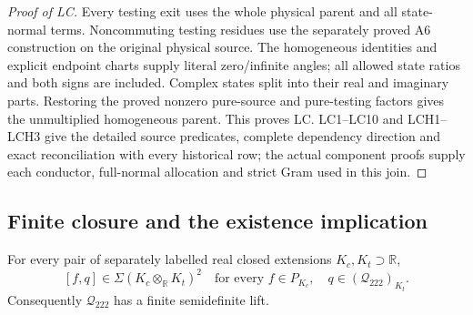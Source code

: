 \begin{proof}[Proof of LC]
Every testing exit uses the whole physical parent and all state-normal
terms.  Noncommuting testing residues use the separately proved A6
construction on the original physical source.  The homogeneous identities
and explicit endpoint charts supply literal zero/infinite angles; all
allowed state ratios and both signs are included.  Complex states split
into their real and imaginary parts.  Restoring the proved nonzero
pure-source and pure-testing factors gives the unmultiplied homogeneous
parent.  This proves LC.  LC1--LC10 and LCH1--LCH3 give the detailed
source predicates, complete dependency direction and exact reconciliation
with every historical row; the actual component proofs supply each
conductor, full-normal allocation and strict Gram used in this join.
\end{proof}

\subsection*{Finite closure and the existence implication}

\begin{theorem}
For every pair of separately labelled
real closed extensions $K_c,K_t\supset\mathbb R$,
\[
       [f,q]\in\Sigma(K_c\otimes_{\mathbb R}K_t)^2
       \quad\text{for every }f\in P_{K_c},\quad
                    q\in(\mathcal Q_{222})_{K_t}.               \tag{FA9}
\]
Consequently $\mathcal Q_{222}$ has a finite semidefinite lift.
\end{theorem}


